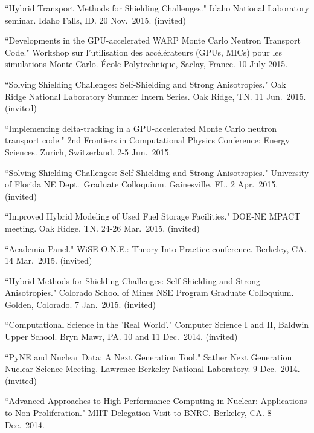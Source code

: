 \begin{bibsection}
\item ``Hybrid Transport Methods for Shielding Challenges." Idaho National Laboratory seminar. Idaho Falls, ID. 20 Nov.\ 2015. (invited) 

\item ``Developments in the GPU-accelerated WARP Monte Carlo Neutron Transport Code." Workshop sur l'utilisation des acc\'{e}l\'{e}rateurs (GPUs, MICs) pour les simulations Monte-Carlo. \'{E}cole Polytechnique, Saclay, France. 10 July 2015. 

\item ``Solving Shielding Challenges: Self-Shielding and Strong Anisotropies." Oak Ridge National Laboratory Summer Intern Series. Oak Ridge, TN. 11 Jun.\ 2015. (invited)

\item ``Implementing delta-tracking in a GPU-accelerated Monte Carlo neutron transport code." 2nd Frontiers in Computational Physics Conference: Energy Sciences. Zurich, Switzerland. 2-5 Jun.\ 2015.  

\item ``Solving Shielding Challenges: Self-Shielding and Strong Anisotropies." University of Florida NE Dept.\ Graduate Colloquium. Gainesville, FL. 2 Apr.\ 2015. (invited)

\item ``Improved Hybrid Modeling of Used Fuel Storage Facilities." DOE-NE MPACT meeting. Oak Ridge, TN. 24-26 Mar.\ 2015. (invited)

\item ``Academia Panel." WiSE O.N.E.: Theory Into Practice conference. Berkeley, CA. 14 Mar.\ 2015. (invited)

\item ``Hybrid Methods for Shielding Challenges: Self-Shielding and Strong Anisotropies." Colorado School of Mines NSE Program Graduate Colloquium. Golden, Colorado. 7 Jan.\ 2015. (invited)

\item ``Computational Science in the 'Real World'." Computer Science I and II, Baldwin Upper School. Bryn Mawr, PA. 10 and 11 Dec.\ 2014. (invited)

\item ``PyNE and Nuclear Data: A Next Generation Tool." Sather Next Generation Nuclear Science Meeting. Lawrence Berkeley National Laboratory. 9 Dec.\ 2014. (invited)

\item ``Advanced Approaches to High-Performance Computing in Nuclear: Applications to Non-Proliferation." MIIT Delegation Visit to BNRC. Berkeley, CA. 8 Dec.\ 2014. 


\end{bibsection}
